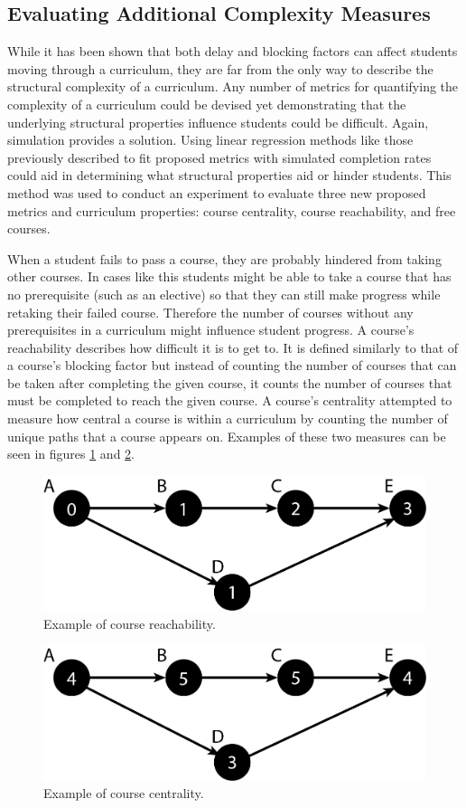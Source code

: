 \documentclass[botnum, fleqn]{unmeethesis}
\begin{document}
    \subsection{Evaluating Additional Complexity Measures}  
      While it has been shown that both delay and blocking factors can affect students moving through a curriculum, they are far from the only way to describe the structural complexity of a curriculum. Any number of metrics for quantifying the complexity of a curriculum could be devised yet demonstrating that the underlying structural properties influence students could be difficult. Again, simulation provides a solution. Using linear regression methods like those previously described to fit proposed metrics with simulated completion rates could aid in determining what structural properties aid or hinder students. This method was used to conduct an experiment to evaluate three new proposed metrics and curriculum properties: course centrality, course reachability, and free courses.

      When a student fails to pass a course, they are probably hindered from taking other courses. In cases like this students might be able to take a course that has no prerequisite (such as an elective) so that they can still make progress while retaking their failed course. Therefore the number of courses without any prerequisites in a curriculum might influence student progress. A course's reachability describes how difficult it is to get to. It is defined similarly to that of a course's blocking factor but instead of counting the number of courses that can be taken after completing the given course, it counts the number of courses that must be completed to reach the given course. A course's centrality attempted to measure how central a course is within a curriculum by counting the number of unique paths that a course appears on. Examples of these two measures can be seen in figures \ref{fig:Reachability} and \ref{fig:Centrality}.

      \begin{figure}
        \centering
        \includegraphics[width=0.5\linewidth]{./figures/Reachability.png}
        \caption{Example of course reachability.}
        \label{fig:Reachability}
      \end{figure}
      \vspace{0.5in}
      \begin{figure}
        \centering
        \includegraphics[width=0.5\linewidth]{./figures/Centrality.png}
        \caption{Example of course centrality.}
        \label{fig:Centrality}
      \end{figure}
\end{document}
